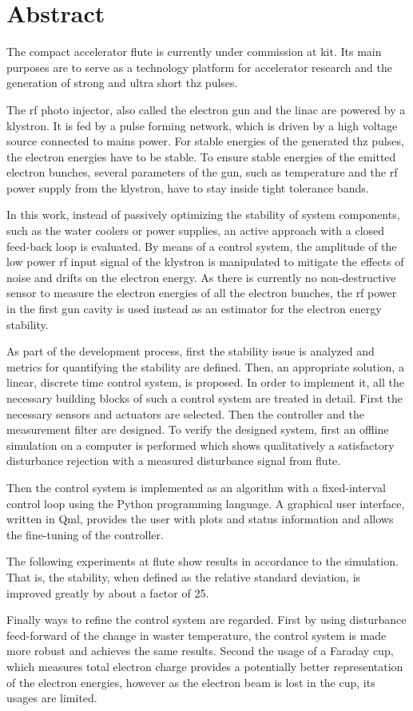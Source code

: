 \chapter*{Abstract}
The compact accelerator \gls{flute} is currently under commission at \gls{kit}. Its main purposes are to serve as a technology platform for accelerator research and the generation of strong and ultra short \gls{thz} pulses.

The \gls{rf} photo injector, also called the electron gun and the \gls{linac} are powered by a klystron. It is fed by a pulse forming network, which is driven by a high voltage source connected to mains power. For stable energies of the generated \gls{thz} pulses, the electron energies have to be stable. To ensure stable energies of the emitted electron bunches, several parameters of the gun, such as temperature and the \gls{rf} power supply from the klystron, have to stay inside tight tolerance bands.

In this work, instead of passively optimizing the stability of system components, such as the water coolers or power supplies, an active approach with a closed feed-back loop is evaluated. By means of a control system, the amplitude of the low power \gls{rf} input signal of the klystron is manipulated to mitigate the effects of noise and drifts on the electron energy. As there is currently no non-destructive sensor to measure the electron energies of all the electron bunches, the \gls{rf} power in the first gun cavity is used instead as an estimator for the electron energy stability.

As part of the development process, first the stability issue is analyzed and metrics for quantifying the stability are defined. Then, an appropriate solution, a linear, discrete time control system, is proposed. In order to implement it, all the necessary building blocks of such a control system are treated in detail. First the necessary sensors and actuators are selected. Then the controller and the measurement filter are designed. To verify the designed system, first an offline simulation on a computer is performed which shows qualitatively a satisfactory disturbance rejection with a measured disturbance signal from \gls{flute}. 

Then the control system is implemented as an algorithm with a fixed-interval control loop using the Python programming language. A graphical user interface, written in Qml, provides the user with plots and status information and allows the fine-tuning of the controller.

The following experiments at \gls{flute} show results in accordance to the simulation. That is, the stability, when defined as the relative standard deviation, is improved greatly by about a factor of \num{25}.

Finally ways to refine the control system are regarded. First by using disturbance feed-forward of the change in waster temperature, the control system is made more robust and achieves the same results. Second the usage of a Faraday cup, which measures total electron charge provides a potentially better representation of the electron energies, however as the electron beam is lost in the cup, its usages are limited.
\cleardoublepage
